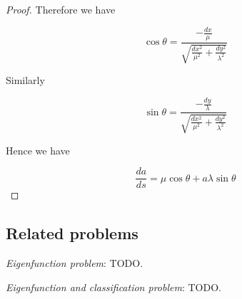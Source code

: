 \begin{proof}
Therefore we have

$$
\cos \theta = \frac{-\frac{dx}{\mu}}{\sqrt{\frac{dx^2}{\mu^2} + \frac{dy^2}{\lambda^2}}}
$$

Similarly

$$
\sin \theta = \frac{-\frac{dy}{\lambda}}{\sqrt{\frac{dx^2}{\mu^2} + \frac{dy^2}{\lambda^2}}}
$$

Hence we have

$$
\frac{da}{ds} = \mu \cos \theta + a \lambda \sin \theta
$$

\end{proof}

\subsection{Related problems}

\emph{Eigenfunction problem}: TODO.

\emph{Eigenfunction and classification problem}: TODO.

\newpage
